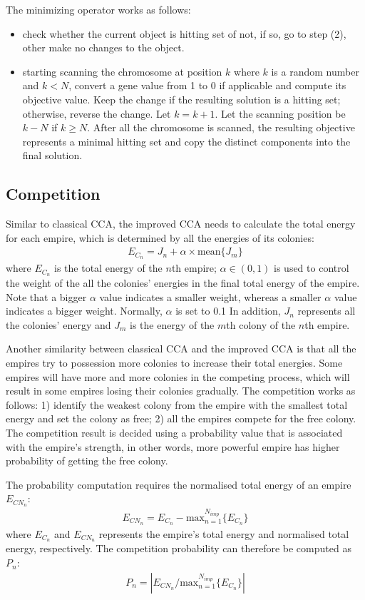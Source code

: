 The minimizing operator works as follows:
\begin{itemize}
	\item check whether the current object is hitting set of not, if so, go to step (2), other make no changes to the object.
	\item starting scanning the chromosome at position $k$ where $k$ is a random number and $k < N$, convert a gene value from 1 to 0 if applicable and compute its objective value. Keep the change if the resulting solution is a hitting set; otherwise, reverse the change. Let $k = k + 1$. Let the scanning position be $k - N$ if $k \geq N$. After all the chromosome is scanned, the resulting objective represents a minimal hitting set and copy the distinct components into the final solution.
\end{itemize}


\subsection{Competition}
Similar to classical CCA, the improved CCA needs to calculate the total energy for each empire, which is determined by all the energies of its colonies:
\begin{align}
	E_{C_n} = J_n + \alpha \times \text{mean}\{J_m\}
\end{align}
where $E_{C_n}$ is the total energy of the $n$th empire; $\alpha \in (0, 1)$ is used to control the weight of the all the colonies' energies in the final total energy of the empire.
Note that a bigger $\alpha$ value indicates a smaller weight, whereas a smaller $\alpha$ value indicates a bigger weight.
Normally, $\alpha$ is set to 0.1
In addition, $J_n$ represents all the colonies' energy and $J_m$ is the energy of the $m$th colony of the $n$th empire.

Another similarity between classical CCA and the improved CCA is that all the empires try to possession more colonies to increase their total energies.
Some empires will have more and more colonies in the competing process, which will result in some empires losing their colonies gradually.
The competition works as follows: 1) identify the weakest colony from the empire with the smallest total energy and set the colony as free; 2) all the empires compete for the free colony.
The competition result is decided using a probability value that is associated with the empire's strength, in other words, more powerful empire has higher probability of getting the free colony.

The probability computation requires the normalised total energy of an empire $E_{CN_n}$: 
\begin{align}
	E_{CN_n} = E_{C_n} - \text{max}_{n = 1}^{N_{imp}}\{E_{C_n}\}
\end{align}
where $E_{C_n}$ and $E_{CN_n}$ represents the empire's total energy and normalised total energy, respectively.
The competition probability can therefore be computed as $P_n$:
\begin{align}
	P_n = |E_{CN_n}/\text{max}_{n = 1}^{N_{imp}}\{E_{C_n}\}|
\end{align}

